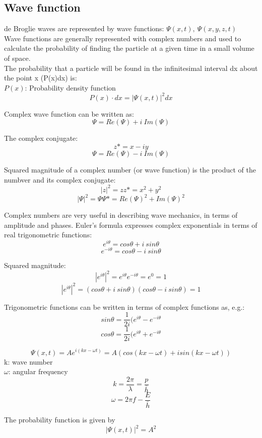 \documentclass[class=article,crop=false]{standalone}
\begin{document}
\subsection{Wave function}
de Broglie waves are represented by wave functions: $\Psi(x,t),\ \Psi(x,y,z,t)$ \\

Wave functions are generally represented with complex numbers and used to calculate the probability of finding the particle at a given time in a small volume of space. \\

The probability that a particle will be found in the infinitesimal interval dx about the point x (P(x)dx) is: \\
$P(x)$: Probability density function
$$ P(x) \cdot dx = \left|\Psi(x,t)\right|^2dx$$

Complex wave function can be written as:
$$ \Psi = Re(\Psi) + i\ Im(\Psi) $$

The complex conjugate:
$$ z* = x-iy $$
$$ \Psi = Re(\Psi) - i\ Im(\Psi) $$

Squared magnitude of a complex number (or wave function) is the product of the numbver and its complex conjugate:
$$ |z|^2 = zz* = x^2 + y^2 $$
$$ |\Psi|^2 = \Psi \Psi* = Re(\Psi)^2 + Im(\Psi)^2 $$

Complex numbers are very useful in describing wave mechanics, in terms of amplitude and phases. Euler's formula expresses complex exponentials in terms of real trigonometric functions:
$$ e^{i\theta} = cos \theta + i\ sin \theta $$
$$ e^{-i\theta} = cos \theta - i\ sin \theta $$

Squared magnitude:
$$ |e^{i\theta}|^2 = e^{i\theta}e^{-i\theta} = e^0 = 1 $$
$$ |e^{i\theta}|^2 = (cos \theta + i\ sin \theta)(cos \theta - i\ sin \theta) = 1 $$

Trigonometric functions can be written in terms of complex functions as, e.g.:
$$ sin\theta = \frac{1}{2i} (e^{i\theta} - e^{-i\theta} $$
$$ cos\theta = \frac{1}{2i} (e^{i\theta} + e^{-i\theta} $$

\begin{result}
	$$ \Psi(x,t) = Ae^{i(kx - \omega t)} = A \left( cos(kx - \omega t) + i sin(kx - \omega t) \right) $$
	k: wave number \\
	$\omega$: angular frequency \\
	$$ k = \frac{2\pi}{\lambda} = \frac{p}{\bar{h}} $$
	$$ \omega = 2\pi f - \frac{E}{\bar{h}} $$

	The probability function is given by
	$$ |\Psi(x,t)|^2 = A^2 $$
\end{result}
\end{document}
